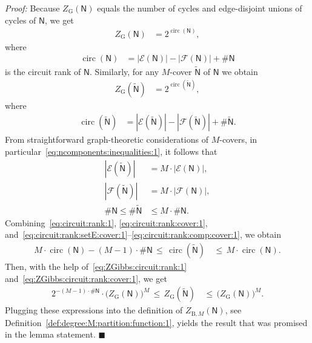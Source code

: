\documentclass[journal, twocolumn]{IEEEtran}
\renewcommand{\leq}{\leqslant}
\newcommand{\set}[1]{\mathcal{#1}}
\newcommand{\graph}[1]{\mathsf{#1}}
\newcommand{\setE}{\set{E}}
\newcommand{\setF}{\set{F}}
\newcommand{\graphN}{\graph{N}}
\newcommand{\ZBetheM}[1]{Z_{\mathrm{B}, #1}}
\newcommand{\cover}[1]{\tilde{#1}}
\newcommand{\cgraph}[1]{\cover{\graph{#1}}}
\newcommand{\?}{\mathrm{?}}
\newcommand{\qedblack}{\hspace*{\fill}%
  $\blacksquare$\smallskip}
\newcommand{\ZGibbs}{Z_{\mathrm{G}}}
\newenvironment{Proof}%
  {\noindent \emph{Proof:}}{\qedblack}
\newcommand{\cirrank}{\operatorname{circ}}
\newcommand{\ncomponents}{\#}
\begin{document}
\begin{Proof}
  Because $\ZGibbs(\graphN)$ equals the number of cycles and edge-disjoint
  unions of cycles of $\graphN$, we get
  \begin{align}
    \ZGibbs(\graphN)
      &= 2^{\cirrank(\graphN)},
           \label{eq:ZGibbs:circuit:rank:1}
  \end{align}
  where
  \begin{align}
    \cirrank(\graphN)
      &= |\setE(\graphN)|
         -
         |\setF(\graphN)|
         +
         \ncomponents\graphN
           \label{eq:circuit:rank:1}
  \end{align}
  is the circuit rank of $\graphN$. Similarly, for any $M$-cover $\cgraph{N}$
  of $\graphN$ we obtain
  \begin{align}
    \ZGibbs(\cgraph{N})
      &= 2^{\cirrank(\cgraph{N})},
           \label{eq:ZGibbs:circuit:rank:cover:1}
  \end{align}
  where
  \begin{align}
    \cirrank(\cgraph{N})
      &= |\setE(\cgraph{N})|
         -
         |\setF(\cgraph{N})|
         +
         \ncomponents\cgraph{N}.
           \label{eq:circuit:rank:cover:1}
  \end{align}
  From straightforward graph-theoretic considerations of $M$-covers, in
  particular~\eqref{eq:ncomponents:inequalities:1}, it follows that
  \begin{align}
    |\setE(\cgraph{N})|
      &= M
           \cdot
           |\setE(\graphN)|,
             \label{eq:circuit:rank:setE:cover:1} \\
    |\setF(\cgraph{N})|
      &= M
           \cdot
           |\setF(\graphN)|,
             \label{eq:circuit:rank:setF:cover:1} \\
    \ncomponents\graphN
       \leq
         \ncomponents\cgraph{N}
      &\leq
         M
           \cdot
           \ncomponents\graphN.
             \label{eq:circuit:rank:comp:cover:1}
  \end{align}
  Combining~\eqref{eq:circuit:rank:1}, \eqref{eq:circuit:rank:cover:1},
  and~\eqref{eq:circuit:rank:setE:cover:1}--\eqref{eq:circuit:rank:comp:cover:1},
  we obtain
  \begin{align*}
    M
      \cdot
      \cirrank(\graphN)
    - 
    (M \! - \! 1)
      \cdot
      \ncomponents\graphN
       \, \leq \,
    \cirrank(\cgraph{N})
      &\, \leq \,
         M
           \cdot
           \cirrank(\graphN).
  \end{align*}
  Then, with the help of~\eqref{eq:ZGibbs:circuit:rank:1}
  and~\eqref{eq:ZGibbs:circuit:rank:cover:1}, we get
  \begin{align*}
    2^{- 
       (M-1) \cdot \ncomponents\graphN
      }
      \cdot
      \big(
        \ZGibbs(\graphN)
      \big)^M
       \, \leq \,
         \ZGibbs(\cgraph{N})
      &\, \leq \,
         \big(
           \ZGibbs(\graphN)
         \big)^M.
  \end{align*}
  Plugging these expressions into the definition of $\ZBetheM{M}(\graphN)$,
  see Definition~\ref{def:degree:M:partition:function:1}, yields the result
  that was promised in the lemma statement.
\end{Proof}
\end{document}
